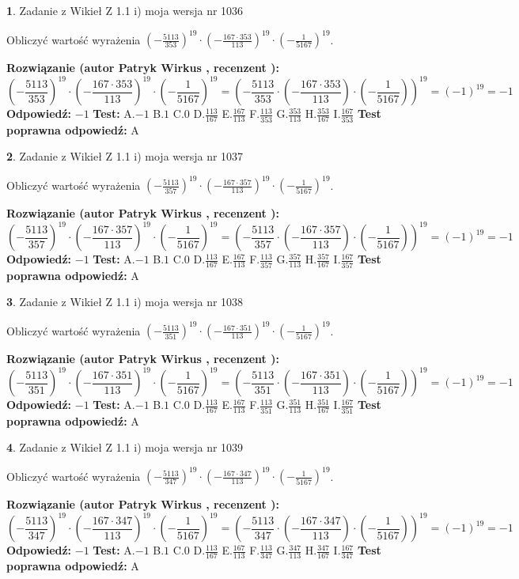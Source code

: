 \documentclass[12pt, a4paper]{article}
\theoremstyle{definition} %
\newtheorem{zad}{}
\newcommand{\zadStart}[1]{\begin{zad}#1\newline}
\newcommand{\zadStop}{\end{zad}}
\newcommand{\rozwStart}[2]{\noindent \textbf{Rozwiązanie (autor #1 , recenzent #2): }\newline}
\newcommand{\rozwStop}{\newline}
\newcommand{\odpStart}{\noindent \textbf{Odpowiedź:}\newline}
\newcommand{\odpStop}{\newline}
\newcommand{\testStart}{\noindent \textbf{Test:}\newline}
\newcommand{\testStop}{\newline}
\newcommand{\kluczStart}{\noindent \textbf{Test poprawna odpowiedź:}\newline}
\newcommand{\kluczStop}{\newline}
\begin{document}
\zadStart{Zadanie z Wikieł Z 1.1 i) moja wersja nr 1036}

Obliczyć wartość wyrażenia $(-\frac{5113}{353})^{19} \cdot (-\frac{167 \cdot 353}{113})^{19} \cdot (-\frac{1}{5167})^{19}$.
\zadStop
\rozwStart{Patryk Wirkus}{}
$$(-\frac{5113}{353})^{19} \cdot (-\frac{167 \cdot 353}{113})^{19} \cdot (-\frac{1}{5167})^{19} = (-\frac{5113}{353} \cdot (-\frac{167 \cdot 353}{113}) \cdot (-\frac{1}{5167}))^{19} = (-1)^{19} = -1$$
\rozwStop
\odpStart
$-1$
\odpStop
\testStart
A.$-1$ B.$1$ C.$0$ D.$\frac{113}{167}$ E.$\frac{167}{113}$
F.$\frac{113}{353}$ G.$\frac{353}{113}$
H.$\frac{353}{167}$
I.$\frac{167}{353}$
\testStop
\kluczStart
A
\kluczStop



\zadStart{Zadanie z Wikieł Z 1.1 i) moja wersja nr 1037}

Obliczyć wartość wyrażenia $(-\frac{5113}{357})^{19} \cdot (-\frac{167 \cdot 357}{113})^{19} \cdot (-\frac{1}{5167})^{19}$.
\zadStop
\rozwStart{Patryk Wirkus}{}
$$(-\frac{5113}{357})^{19} \cdot (-\frac{167 \cdot 357}{113})^{19} \cdot (-\frac{1}{5167})^{19} = (-\frac{5113}{357} \cdot (-\frac{167 \cdot 357}{113}) \cdot (-\frac{1}{5167}))^{19} = (-1)^{19} = -1$$
\rozwStop
\odpStart
$-1$
\odpStop
\testStart
A.$-1$ B.$1$ C.$0$ D.$\frac{113}{167}$ E.$\frac{167}{113}$
F.$\frac{113}{357}$ G.$\frac{357}{113}$
H.$\frac{357}{167}$
I.$\frac{167}{357}$
\testStop
\kluczStart
A
\kluczStop



\zadStart{Zadanie z Wikieł Z 1.1 i) moja wersja nr 1038}

Obliczyć wartość wyrażenia $(-\frac{5113}{351})^{19} \cdot (-\frac{167 \cdot 351}{113})^{19} \cdot (-\frac{1}{5167})^{19}$.
\zadStop
\rozwStart{Patryk Wirkus}{}
$$(-\frac{5113}{351})^{19} \cdot (-\frac{167 \cdot 351}{113})^{19} \cdot (-\frac{1}{5167})^{19} = (-\frac{5113}{351} \cdot (-\frac{167 \cdot 351}{113}) \cdot (-\frac{1}{5167}))^{19} = (-1)^{19} = -1$$
\rozwStop
\odpStart
$-1$
\odpStop
\testStart
A.$-1$ B.$1$ C.$0$ D.$\frac{113}{167}$ E.$\frac{167}{113}$
F.$\frac{113}{351}$ G.$\frac{351}{113}$
H.$\frac{351}{167}$
I.$\frac{167}{351}$
\testStop
\kluczStart
A
\kluczStop



\zadStart{Zadanie z Wikieł Z 1.1 i) moja wersja nr 1039}

Obliczyć wartość wyrażenia $(-\frac{5113}{347})^{19} \cdot (-\frac{167 \cdot 347}{113})^{19} \cdot (-\frac{1}{5167})^{19}$.
\zadStop
\rozwStart{Patryk Wirkus}{}
$$(-\frac{5113}{347})^{19} \cdot (-\frac{167 \cdot 347}{113})^{19} \cdot (-\frac{1}{5167})^{19} = (-\frac{5113}{347} \cdot (-\frac{167 \cdot 347}{113}) \cdot (-\frac{1}{5167}))^{19} = (-1)^{19} = -1$$
\rozwStop
\odpStart
$-1$
\odpStop
\testStart
A.$-1$ B.$1$ C.$0$ D.$\frac{113}{167}$ E.$\frac{167}{113}$
F.$\frac{113}{347}$ G.$\frac{347}{113}$
H.$\frac{347}{167}$
I.$\frac{167}{347}$
\testStop
\kluczStart
A
\kluczStop
\end{document}
